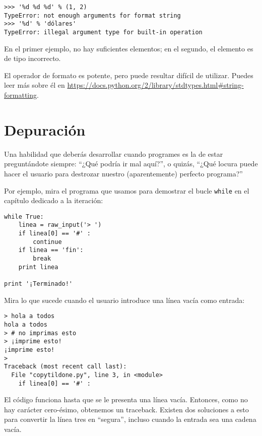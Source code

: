 
\beforeverb
\begin{verbatim}
>>> '%d %d %d' % (1, 2)
TypeError: not enough arguments for format string
>>> '%d' % 'dólares'
TypeError: illegal argument type for built-in operation
\end{verbatim}
\afterverb
%
En el primer ejemplo, no hay suficientes elementos; en el
segundo, el elemento es de tipo incorrecto.

El operador de formato es potente, pero puede resultar difícil de utilizar.
Puedes leer más sobre él en
\url{https://docs.python.org/2/library/stdtypes.html#string-formatting}.




\section{Depuración}

Una habilidad que deberás desarrollar cuando programes es la de
estar preguntándote siempre: ``¿Qué podría ir mal aquí?'', o quizás,
``¿Qué locura puede hacer el usuario para destrozar nuestro (aparentemente)
perfecto programa?''

Por ejemplo, mira el programa que usamos para demostrar el bucle
{\tt while} en el capítulo dedicado a la iteración:

\beforeverb
\begin{verbatim}
while True:
    linea = raw_input('> ')
    if linea[0] == '#' :
        continue
    if linea == 'fin':
        break
    print linea

print '¡Terminado!'
\end{verbatim}
\afterverb
%
Mira lo que sucede cuando el usuario introduce una línea vacía como entrada:

\beforeverb
\begin{verbatim}
> hola a todos
hola a todos
> # no imprimas esto
> ¡imprime esto!
¡imprime esto!
> 
Traceback (most recent call last):
  File "copytildone.py", line 3, in <module>
    if linea[0] == '#' :
\end{verbatim}
\afterverb
%
El código funciona hasta que se le presenta una línea vacía. Entonces,
como no hay carácter cero-ésimo, obtenemos un traceback. Existen dos
soluciones a esto para convertir la línea tres en ``segura'', incluso
cuando la entrada sea una cadena vacía.

